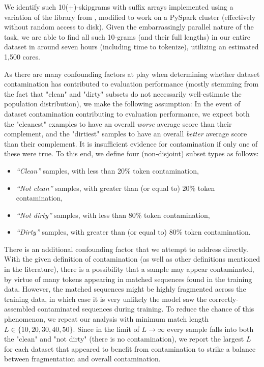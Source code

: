 We identify such 10(+)-skipgrams with suffix arrays implemented using a variation of the library from \cite{suffixarrays}, modified to work on a PySpark cluster (effectively without random access to disk).  Given the embarrassingly parallel nature of the task, we are able to find all such 10-grams (and their full lengths) in our entire dataset in around seven hours (including time to tokenize), utilizing an estimated 1,500 cores.

As there are many confounding factors at play when determining whether dataset contamination has contributed to evaluation performance (mostly stemming from the fact that "clean" and "dirty" subsets do not necessarily well-estimate the population distribution), we make the following assumption: In the event of dataset contamination contributing to evaluation performance, we expect both the "cleanest" examples to have an overall \emph{worse} average score than their complement, and the "dirtiest" samples to have an overall \emph{better} average score than their complement. It is insufficient evidence for contamination if only one of these were true.  To this end, we define four (non-disjoint) subset types as follows:
\begin{itemize}
    \item \textit{``Clean''} samples, with less than 20\% token contamination,
    \item \textit{``Not clean''} samples, with greater than (or equal to) 20\% token contamination,
    \item \textit{``Not dirty''} samples, with less than 80\% token contamination,
    \item \textit{``Dirty''} samples, with greater than (or equal to) 80\% token contamination.
\end{itemize}

There is an additional confounding factor that we attempt to address directly. With the given definition of contamination (as well as other definitions mentioned in the literature), there is a possibility that a sample may appear contaminated, by virtue of many tokens appearing in matched sequences found in the training data. However, the matched sequences might be highly fragmented across the training data, in which case it is very unlikely the model saw the correctly-assembled contaminated sequences during training.  To reduce the chance of this phenomenon, we repeat our analysis with minimum match length $L\in \{10, 20, 30, 40, 50\}$.  Since in the limit of $L\rightarrow \infty$ every sample falls into both the "clean" and "not dirty" (there is no contamination), we report the largest $L$ for each dataset that appeared to benefit from contamination to strike a balance between fragmentation and overall contamination.

